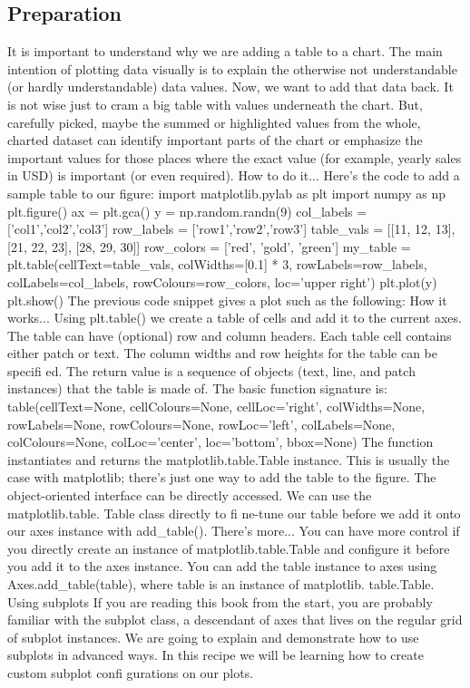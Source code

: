 \subsection{Preparation}
It is important to understand why we are adding a table to a chart. The main intention
of plotting data visually is to explain the otherwise not understandable (or hardly
understandable) data values. Now, we want to add that data back. It is not wise
just to cram a big table with values underneath the chart.
But, carefully picked, maybe the summed or highlighted values from the whole, charted
dataset can identify important parts of the chart or emphasize the important values
for those places where the exact value (for example, yearly sales in USD) is important
(or even required).
How to do it...
Here's the code to add a sample table to our figure:
import matplotlib.pylab as plt
import numpy as np
plt.figure()
ax = plt.gca()
y = np.random.randn(9)
col_labels = ['col1','col2','col3']
row_labels = ['row1','row2','row3']
table_vals = [[11, 12, 13], [21, 22, 23], [28, 29, 30]]
row_colors = ['red', 'gold', 'green']
my_table = plt.table(cellText=table_vals,
 colWidths=[0.1] * 3,
 rowLabels=row_labels,
 colLabels=col_labels,
 rowColours=row_colors,
 loc='upper right')
plt.plot(y)
plt.show()
The previous code snippet gives a plot such as the following:
How it works...
Using plt.table() we create a table of cells and add it to the current axes. The table can
have (optional) row and column headers. Each table cell contains either patch or text. The
column widths and row heights for the table can be specifi ed. The return value is a sequence
of objects (text, line, and patch instances) that the table is made of.
The basic function signature is:
table(cellText=None, cellColours=None,
 cellLoc='right', colWidths=None,
 rowLabels=None, rowColours=None, rowLoc='left',
 colLabels=None, colColours=None, colLoc='center',
 loc='bottom', bbox=None)
The function instantiates and returns the matplotlib.table.Table instance. This is
usually the case with matplotlib; there's just one way to add the table to the figure. The
object-oriented interface can be directly accessed. We can use the matplotlib.table.
Table class directly to fi ne-tune our table before we add it onto our axes instance with
add_table().
There's more...
You can have more control if you directly create an instance of matplotlib.table.Table
and configure it before you add it to the axes instance. You can add the table instance
to axes using Axes.add_table(table), where table is an instance of matplotlib.
table.Table.
Using subplots
If you are reading this book from the start, you are probably familiar with the subplot class,
a descendant of axes that lives on the regular grid of subplot instances. We are going to
explain and demonstrate how to use subplots in advanced ways.
In this recipe we will be learning how to create custom subplot confi gurations on our plots.
